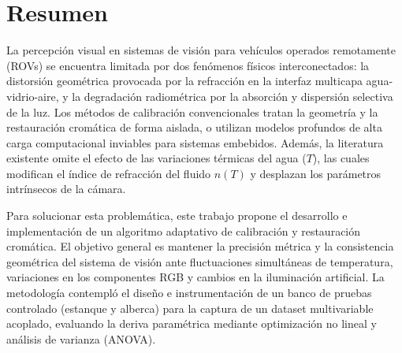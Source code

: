 \documentclass[12pt,letterpaper,spanish,twoside,openright]{report}
\begin{document}
\chapter*{Resumen}

La percepción visual en sistemas de visión para vehículos operados remotamente (ROVs) se encuentra limitada por dos fenómenos físicos interconectados: la distorsión geométrica provocada por la refracción en la interfaz multicapa agua-vidrio-aire, y la degradación radiométrica por la absorción y dispersión selectiva de la luz. Los métodos de calibración convencionales tratan la geometría y la restauración cromática de forma aislada, o utilizan modelos profundos de alta carga computacional inviables para sistemas embebidos. Además, la literatura existente omite el efecto de las variaciones térmicas del agua ($T$), las cuales modifican el índice de refracción del fluido $n(T)$ y desplazan los parámetros intrínsecos de la cámara.

Para solucionar esta problemática, este trabajo propone el desarrollo e implementación de un algoritmo adaptativo de calibración y restauración cromática. El objetivo general es mantener la precisión métrica y la consistencia geométrica del sistema de visión ante fluctuaciones simultáneas de temperatura, variaciones en los componentes RGB y cambios en la iluminación artificial. La metodología contempló el diseño e instrumentación de un banco de pruebas controlado (estanque y alberca) para la captura de un dataset multivariable acoplado, evaluando la deriva paramétrica mediante optimización no lineal y análisis de varianza (ANOVA).
\end{document}
